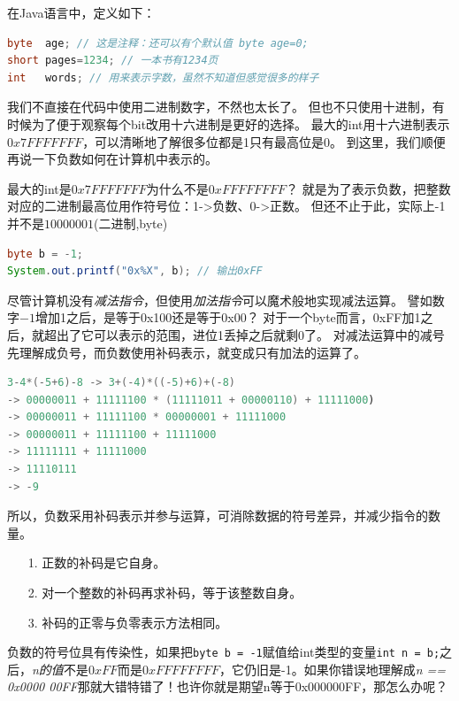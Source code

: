 \vspace{0.3cm}\noindent
在Java语言中，定义如下：
\begin{lstlisting}[language=Java]
byte  age; // 这是注释：还可以有个默认值 byte age=0;
short pages=1234; // 一本书有1234页
int   words; // 用来表示字数，虽然不知道但感觉很多的样子
\end{lstlisting}

我们不直接在代码中使用二进制数字，不然也太长了。
但也不只使用十进制，有时候为了便于观察每个bit改用十六进制是更好的选择。
最大的int用十六进制表示$0x7FFFFFFF$，可以清晰地了解很多位都是1只有最高位是0。
到这里，我们顺便再说一下负数如何在计算机中表示的。

最大的int是$0x7FFFFFFF$为什么不是$0xFFFFFFFF$？
就是为了表示负数，把整数对应的二进制最高位用作符号位：1->负数、0->正数。
但还不止于此，实际上-1并不是$1000 0001$(二进制,byte)
\vspace{0.2cm}
\begin{lstlisting}[language=Java]
byte b = -1;
System.out.printf("0x%X", b); // 输出0xFF
\end{lstlisting}

尽管计算机没有\emph{减法指令}，但使用\emph{加法指令}可以魔术般地实现减法运算。
譬如数字$-1$增加1之后，是等于0x100还是等于0x00？
对于一个byte而言，0xFF加1之后，就超出了它可以表示的范围，进位1丢掉之后就剩0了。
对减法运算中的减号先理解成负号，而负数使用补码表示，就变成只有加法的运算了。
\begin{lstlisting}[language=Java]
3-4*(-5+6)-8 -> 3+(-4)*((-5)+6)+(-8)
-> 00000011 + 11111100 * (11111011 + 00000110) + 11111000)
-> 00000011 + 11111100 * 00000001 + 11111000
-> 00000011 + 11111100 + 11111000
-> 11111111 + 11111000
-> 11110111
-> -9
\end{lstlisting}

\noindent
所以，负数采用补码表示并参与运算，可消除数据的符号差异，并减少指令的数量。
\begin{itemize}
\item[1.]正数的补码是它自身。
\item[2.]对一个整数的补码再求补码，等于该整数自身。
\item[3.]补码的正零与负零表示方法相同。
\end{itemize}

\noindent
负数的符号位具有传染性，如果把\lstinline{byte b = -1}赋值给int类型的变量\lstinline{int n = b;}之后，\emph{n的值}不是$0xFF$而是$0xFFFFFFFF$，它仍旧是-1。如果你错误地理解成\emph{n == 0x0000 00FF}那就大错特错了！也许你就是期望n等于0x000000FF，那怎么办呢？

